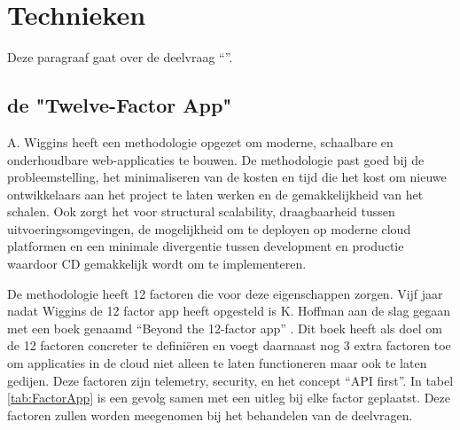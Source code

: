 \chapter{Technieken}

\label{Chapter3}

Deze paragraaf gaat over de deelvraag \enquote{\deeltechnieken}.

\section{de "Twelve-Factor App"}

A. Wiggins \parencite{12Factor} heeft een methodologie opgezet om moderne, schaalbare en onderhoudbare web-applicaties te bouwen. De methodologie past goed bij de probleemstelling, het minimaliseren van de kosten en tijd die het kost om nieuwe ontwikkelaars aan het project te laten werken en de gemakkelijkheid van het schalen. Ook zorgt het voor structural scalability, draagbaarheid tussen uitvoeringsomgevingen, de mogelijkheid om te deployen op moderne cloud platformen en een minimale divergentie tussen development en productie waardoor CD gemakkelijk wordt om te implementeren.

De methodologie heeft 12 factoren die voor deze eigenschappen zorgen. Vijf jaar nadat Wiggins de 12 factor app heeft opgesteld is K. Hoffman aan de slag gegaan met een boek genaamd \enquote{Beyond the 12-factor app} \parencite{Beyond12Factor}. Dit boek heeft als doel om de 12 factoren concreter te definiëren en voegt daarnaast nog 3 extra factoren toe om applicaties in de cloud niet alleen te laten functioneren maar ook te laten gedijen. Deze factoren zijn telemetry, security, en het concept \enquote{API first}. In tabel \ref{tab:FactorApp} is een gevolg samen met een uitleg bij elke factor geplaatst. Deze factoren zullen worden meegenomen bij het behandelen van de deelvragen.

